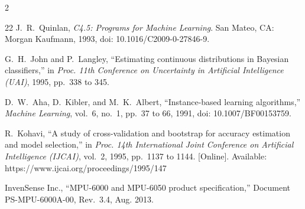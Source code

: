 \documentclass[journal,onecolumn]{IEEEtran}
\begin{document}
\begin{multicols}{2}
\begin{thebibliography}{22}
J.~R.~Quinlan, \emph{C4.5: Programs for Machine Learning}. San Mateo, CA: Morgan Kaufmann, 1993, doi: 10.1016/C2009-0-27846-9.

G.~H.~John and P.~Langley, ``Estimating continuous distributions in Bayesian classifiers,'' in \emph{Proc. 11th Conference on Uncertainty in Artificial Intelligence (UAI)}, 1995, pp.~338 to 345.

D.~W.~Aha, D.~Kibler, and M.~K.~Albert, ``Instance-based learning algorithms,'' \emph{Machine Learning}, vol.~6, no.~1, pp.~37 to 66, 1991, doi: 10.1007/BF00153759.

R.~Kohavi, ``A study of cross-validation and bootstrap for accuracy estimation and model selection,'' in \emph{Proc. 14th International Joint Conference on Artificial Intelligence (IJCAI)}, vol.~2, 1995, pp.~1137 to 1144. [Online]. Available: https://www.ijcai.org/proceedings/1995/147

InvenSense Inc., ``MPU-6000 and MPU-6050 product specification,'' Document PS-MPU-6000A-00, Rev.~3.4, Aug. 2013.

\end{thebibliography}
\end{multicols}
\endgroup
\end{document}
